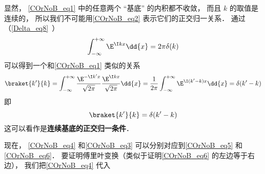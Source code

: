 显然， \autoref{COrNoB_eq1} 中的任意两个 “基底” 的内积都不收敛， 而且 $k$ 的取值是连续的， 所以我们不可能用\autoref{COrNoB_eq2} 表示它们的正交归一关系． 通过（\autoref{Delta_eq8}~）
\begin{equation}
\int_{-\infty}^{+\infty} \E^{\I kx}\dd{x} = 2\pi \delta(k)
\end{equation}
可以得到一个和\autoref{COrNoB_eq1} 类似的关系
\begin{equation}
\braket{k'}{k} = \int_{-\infty}^{+\infty} \frac{\E^{-\I k'x}}{\sqrt{2\pi}} \frac{\E^{\I kx}}{\sqrt{2\pi}}\dd{x}
= \frac{1}{2\pi}\int_{-\infty}^{+\infty} \E^{\I (k'-k)x}\dd{x}
= \delta(k' - k)
\end{equation}
即
\begin{equation}
\braket{k'}{k} = \delta(k' - k)
\end{equation}
这可以看作是\textbf{连续基底的正交归一条件}．

现在， \autoref{COrNoB_eq4} 和\autoref{COrNoB_eq3} 可以分别对应到\autoref{COrNoB_eq5} 和\autoref{COrNoB_eq6}． 要证明傅里叶变换（类似于证明\autoref{COrNoB_eq6} 的左边等于右边）， 我们把\autoref{COrNoB_eq4} 代入